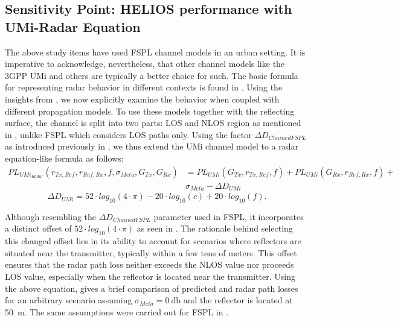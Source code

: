 \subsection{Sensitivity Point: HELIOS performance with UMi-Radar Equation}\label{Interpreting Different Channel Models}
The above study items have used FSPL channel models in an urban setting. It is imperative to acknowledge, nevertheless, that other channel models like the 3GPP UMi and others are typically a better choice for such. The basic formula for representing radar behavior in different contexts is found in . Using the insights from , we now explicitly examine the behavior when coupled with different propagation models. To use these models together with the reflecting surface, the channel is split into two parts: LOS and NLOS region as mentioned in , unlike FSPL which considers LOS paths only. Using the factor $\Delta D_{ChainedFSPL}$ as introduced previously in , we thus extend the UMi channel model to a radar equation-like formula as follows:
\begin{equation}
	\begin{aligned}
		PL_{UMi_{Radar}}(r_{Tx,Ref},r_{Ref,Rx},f,\sigma_{Meta},G_{Tx}, G_{Rx})&=PL_{UMi}(G_{Tx}, r_{Tx,Ref},f)+PL_{UMi}(G_{Rx}, r_{Ref,Rx},f)+\\ &\sigma_{Meta}-\Delta D_{UMi}
	\end{aligned}
\end{equation}
\begin{equation} \label{Umi_delta}
	\Delta D_{UMi}= 52\cdot log_{10}(4 \cdot \pi)- 20\cdot log_{10}(c)+20\cdot log_{10}(f).
\end{equation}

Although resembling the $\Delta D_{ChainedFSPL}$ parameter used in FSPL, it incorporates a distinct offset of $52\cdot log_{10}(4 \cdot \pi)$ as seen in . The rationale behind selecting this changed offset lies in its ability to account for scenarios where reflectors are situated near the transmitter, typically within a few tens of meters. This offset ensures that the radar path loss neither exceeds the NLOS value nor proceeds LOS value, especially when the reflector is located near the transmitter. Using the above equation,  gives a brief comparison of predicted and radar path losses for an arbitrary scenario assuming $\sigma_{Meta}=\SI{0}{\decibel}$ and the reflector is located at \SI{50}{\meter}. The same assumptions were carried out for FSPL in .

